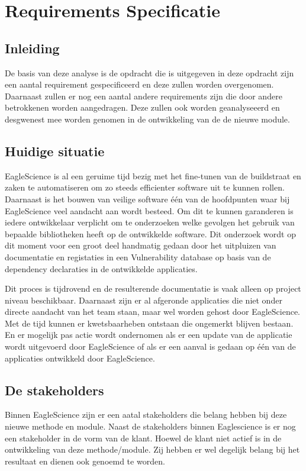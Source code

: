 
\chapter{Requirements Specificatie}\label{ch:requirements-specificatie}


\section{Inleiding}\label{sec:RS_inleiding}
\lipsum[01]

De basis van deze analyse is de opdracht die is uitgegeven in deze opdracht zijn een aantal requirement gespecificeerd en deze zullen worden overgenomen. Daarnaast zullen er nog een aantal andere requirements zijn die door andere betrokkenen worden aangedragen. Deze zullen ook worden geanalyseeerd en desgwenest mee worden genomen in de ontwikkeling van de de nieuwe module.


\section{Huidige situatie}\label{sec:huidige-situatie}
EagleScience is al een geruime tijd bezig met het fine-tunen van de buildstraat en zaken te automatiseren om zo steeds efficienter software uit te kunnen rollen. Daarnaast is het bouwen van veilige software één van de hoofdpunten waar bij EagleScience veel aandacht aan wordt besteed. Om dit te kunnen garanderen is iedere ontwikkelaar verplicht om te onderzoeken welke gevolgen het gebruik van bepaalde bibliotheken heeft op de ontwikkelde software. Dit onderzoek wordt op dit moment voor een groot deel handmatig gedaan door het uitpluizen van documentatie en registaties in een Vulnerability database op basis van de dependency declaraties in de ontwikkelde applicaties.

Dit proces is tijdrovend en de resulterende documentatie is vaak alleen op project niveau beschikbaar. Daarnaast zijn er al afgeronde applicaties die niet onder directe aandacht van het team staan, maar wel worden gehost door EagleScience. Met de tijd kunnen er kwetsbaarheben ontstaan die ongemerkt blijven bestaan. En er mogelijk pas actie wordt ondernomen als er een update van de applicatie wordt uitgevoerd door EagleScience of als er een aanval is gedaan op één van de applicaties ontwikkeld door EagleScience.

\section{De stakeholders}\label{sec:de-stakeholders}
Binnen EagleScience zijn er een aatal stakeholders die belang hebben bij deze nieuwe methode en module. Naast de stakeholders binnen Eaglescience is er nog een stakeholder in de vorm van de klant. Hoewel de klant niet actief is in de ontwikkeling van deze methode/module. Zij hebben er wel degelijk belang bij het resultaat en dienen ook genoemd te worden.
